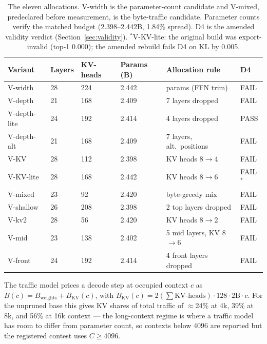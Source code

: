 \documentclass[10pt,letterpaper,twocolumn]{article}
\begin{document}
\begin{table}[ht]
\centering\scriptsize\setlength{\tabcolsep}{4pt}
\begin{tabular}{@{}llllll@{}}
\toprule
Variant & Layers & KV-heads & Params (B) & Allocation rule & D4 \\
\midrule
V-width & 28 & 224 & 2.442 & params (FFN trim) & FAIL \\
V-depth & 21 & 168 & 2.409 & 7 layers dropped & FAIL \\
V-depth-lite & 24 & 192 & 2.414 & 4 layers dropped & PASS \\
V-depth-alt & 21 & 168 & 2.409 & 7 layers, alt.\ positions & FAIL \\
V-KV & 28 & 112 & 2.398 & KV heads 8$\rightarrow$4 & FAIL \\
V-KV-lite & 28 & 168 & 2.442 & KV heads 8$\rightarrow$6 & FAIL$^*$ \\
V-mixed & 23 & 92 & 2.420 & byte-greedy mix & FAIL \\
V-shallow & 26 & 208 & 2.398 & 2 top layers dropped & FAIL \\
V-kv2 & 28 & 56 & 2.420 & KV heads 8$\rightarrow$2 & FAIL \\
V-mid & 23 & 138 & 2.402 & 5 mid layers, KV 8$\rightarrow$6 & FAIL \\
V-front & 24 & 192 & 2.414 & 4 front layers dropped & FAIL \\
\bottomrule
\end{tabular}
\caption{The eleven allocations. V-width is the parameter-count
candidate and V-mixed, predeclared before measurement, is the
byte-traffic candidate. Parameter counts verify the matched budget
(2.398--2.442B, 1.84\% spread). D4 is the amended validity verdict
(Section~\ref{sec:validity}). $^*$V-KV-lite: the original build was
export-invalid (top-1 0.000); the amended rebuild fails D4 on KL by 0.005.}
\end{table}

The traffic model prices a decode step at occupied context $c$ as
$B(c) = B_{\text{weights}} + B_{\text{KV}}(c)$, with
$B_{\text{KV}}(c) = 2(\sum \text{KV-heads})\cdot128\cdot2\text{B}\cdot c$. For the unpruned base this gives KV
shares of total traffic of $\approx$24\% at 4k, 39\% at 8k, and
56\% at 16k context --- the long-context regime is where a traffic
model has room to differ from parameter count, so contexts below 4096 are reported but the registered contest uses $C \geq 4096$.
\end{document}
